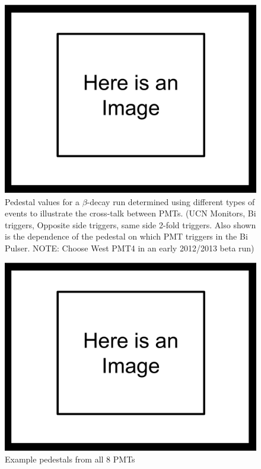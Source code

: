 \begin{figure}[h] 
\centering
\includegraphics[scale=.25]{3-UCNAAnalysis/ImageHolder.pdf}
\caption{Pedestal values for a $\beta$-decay run determined using different 
types of events to illustrate the cross-talk between PMTs. (UCN Monitors, 
Bi triggers, Opposite side triggers, same side 2-fold triggers. Also shown 
is the dependence of the pedestal on which PMT triggers in the Bi Pulser. NOTE:
Choose West PMT4 in an early 2012/2013 beta run) }
\label{fig:peds_types}
\end{figure}

\begin{figure}[h] 
\centering
\includegraphics[scale=.25]{3-UCNAAnalysis/ImageHolder.pdf}
\caption{Example pedestals from all 8 PMTs}
\label{fig:peds_ind}
\end{figure}

